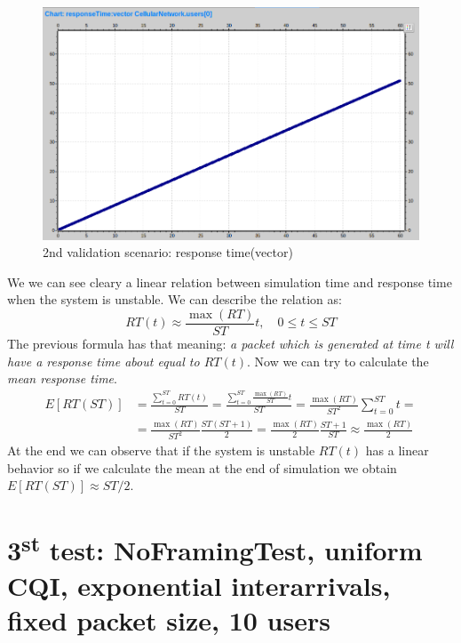 \begin{figure}[H]
  \includegraphics[width=1\textwidth]{images/response-timeVec}
  \caption{2nd validation scenario: response time(vector)}
  \label{fig:2nd validation scenario: response time(vector)}
\end{figure}
We we can see cleary a linear relation between simulation time and response time when the system is unstable. We can describe the relation as:
\begin{equation} 
	RT(t) \approx \frac{\max(RT)}{ST}t, \quad 0\le t \le ST 
\end{equation}
The previous formula has that meaning: \textit{a packet which is generated at time t will have a response time about equal to \(RT(t)\)}. Now we can try to calculate the \textit{mean response time}.
\begin{equation}
\begin{split}
E[RT(ST)] &= \frac{\sum\limits^{ST}_{t=0} RT(t)}{ST} = \frac{\sum\limits^{ST}_{t=0} \frac{\max(RT)}{ST}t}{ST} = \frac{\max(RT)}{ST^2}\sum\limits^{ST}_{t=0}t =
	\\ &= \frac{\max(RT)}{ST^2}\frac{ST(ST+1)}{2} = \frac{\max(RT)}{2}\frac{ST+1}{ST} \approx \frac{\max(RT)}{2}
\end{split}
\end{equation}
At the end we can observe that if the system is unstable \(RT(t)\) has a linear behavior so if we calculate the mean at the end of simulation we obtain \(E[RT(ST)] \approx ST/2\). 


\section{3\textsuperscript{st} test: NoFramingTest, uniform CQI, exponential interarrivals, fixed packet size, 10 users}

